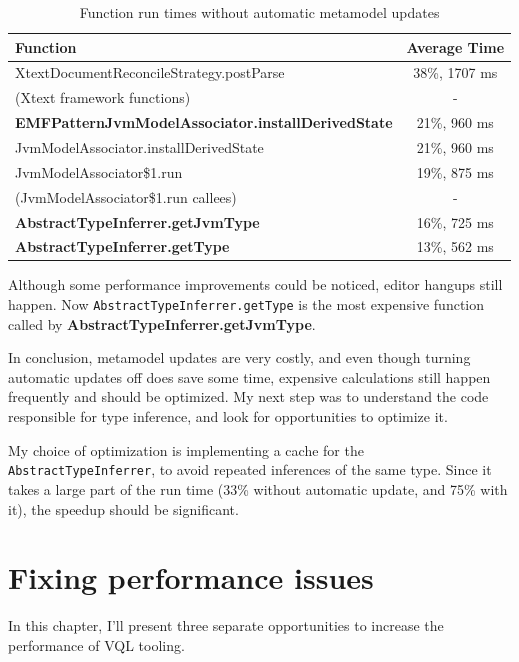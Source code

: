 \documentclass[11pt,a4paper,oneside]{report}
\begin{document}
\begin{table}[ht]
    \footnotesize
    \centering
    \begin{tabular}{ l c }
        \toprule
        Function & Average Time \\
        \midrule
        XtextDocumentReconcileStrategy.postParse & 38\%, 1707 ms \\
        (Xtext framework functions) & - \\
        \textbf{EMFPatternJvmModelAssociator.installDerivedState} & 21\%, 960 ms \\
        JvmModelAssociator.installDerivedState & 21\%, 960 ms \\
        JvmModelAssociator\$1.run & 19\%, 875 ms \\
        (JvmModelAssociator\$1.run callees) & - \\
        \textbf{AbstractTypeInferrer.getJvmType} & 16\%, 725 ms \\
        \textbf{AbstractTypeInferrer.getType} & 13\%, 562 ms \\
        \bottomrule
    \end{tabular}
    \caption{Function run times without automatic metamodel updates}
    \label{tab:postparse-no-auto-update}
\end{table}

Although some performance improvements could be noticed, editor hangups still
happen. Now \texttt{AbstractTypeInferrer.getType} is the most expensive function
called by \textbf{AbstractTypeInferrer.getJvmType}.

In conclusion, metamodel updates are very costly, and even though turning
automatic updates off does save some time, expensive calculations still happen
frequently and should be optimized. My next step was to understand the code
responsible for type inference, and look for opportunities to optimize it.

My choice of optimization is implementing a cache for the
\texttt{AbstractTypeInferrer}, to avoid repeated inferences of the same type.
Since it takes a large part of the run time (33\% without automatic update,
and 75\% with it), the speedup should be significant.

\chapter{Fixing performance issues}
In this chapter, I'll present three separate opportunities to increase the
performance of VQL tooling.
\end{document}
